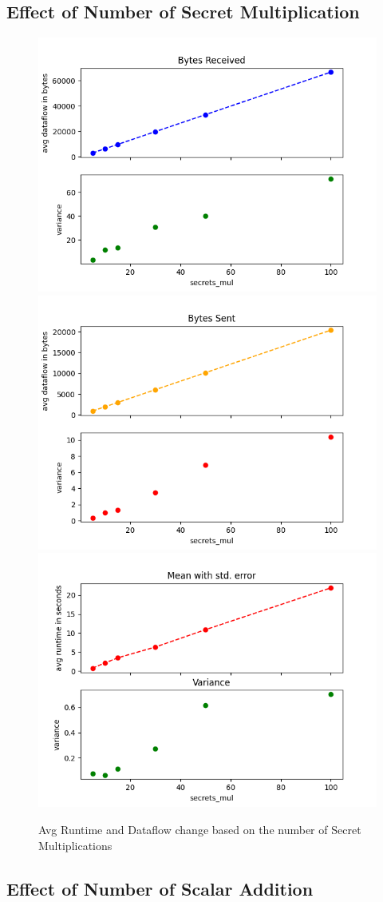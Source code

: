 \documentclass[10pt,conference,compsocconf]{IEEEtran}
\begin{document}
\subsection{Effect of Number of Secret Multiplication}
\begin{figure}[ht]
    \includegraphics[width=0.49\linewidth]{../performance_analysis/dataflow_in_secrets_multiplications.png}
    \includegraphics[width=0.49\linewidth]{../performance_analysis/dataflow_out_secrets_multiplications.png}
    \includegraphics[width=0.49\linewidth]{../performance_analysis/runtime_secrets_multiplications.png}
    \caption{Avg Runtime and Dataflow change based on the number of Secret Multiplications}
\end{figure}

\subsection{Effect of Number of Scalar Addition}
\end{document}
